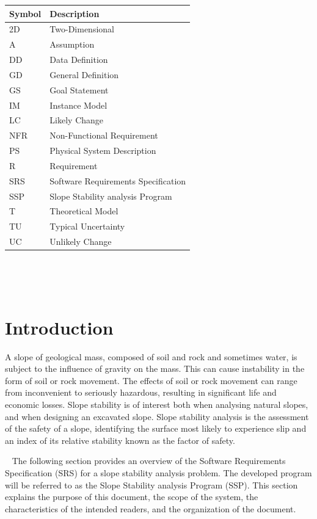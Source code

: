 \documentclass[12pt]{article}
\newcommand{\progname}{SSP}
\renewcommand{\arraystretch}{1}
\begin{document}
\renewcommand{\arraystretch}{1.2}
\begin{tabular}{l l} 
  \toprule		
  \textbf{Symbol} & \textbf{Description}\\
  \midrule 
  2D & Two-Dimensional\\
  A & Assumption\\
  DD & Data Definition\\
  GD & General Definition\\
  GS & Goal Statement\\
  IM & Instance Model\\
  LC & Likely Change\\
  NFR & Non-Functional Requirement\\
  PS & Physical System Description\\
  R & Requirement\\
  SRS & Software Requirements Specification\\
  \progname\ & Slope Stability analysis Program\\
  T & Theoretical Model\\
  TU & Typical Uncertainty\\
  UC & Unlikely Change\\
  \bottomrule
\end{tabular}\\

\newpage

\tableofcontents

~\newpage


\setlength{\tabcolsep}{6pt}

\section{Introduction}

A slope of geological mass, composed of soil and rock and sometimes water, is 
subject to the influence of gravity on the mass. This can cause instability in 
the form of soil or rock movement. The effects of soil or rock movement can 
range from inconvenient to seriously hazardous, resulting in significant life 
and economic losses. Slope stability is of interest both when analysing natural 
slopes, and when designing an excavated slope. Slope stability analysis is the 
assessment of the safety of a slope, identifying the surface most likely to 
experience slip and an index of its relative stability known as the factor of 
safety.

~\newline
The following section provides an overview of the Software Requirements 
Specification (SRS) for a slope stability analysis problem. The developed 
program will be referred to as the Slope Stability analysis Program 
(\progname). This section explains the purpose of this document, the 
scope of the system, the characteristics of the intended readers, and the 
organization of the document.
\end{document}
